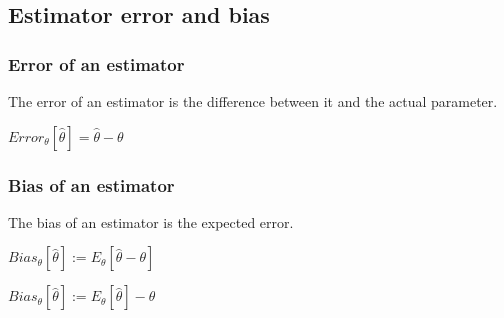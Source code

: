 
\subsection{Estimator error and bias}

\subsubsection{Error of an estimator}

The error of an estimator is the difference between it and the actual parameter.

\(Error_{\theta }[\hat \theta ]=\hat \theta - \theta \)

\subsubsection{Bias of an estimator}

The bias of an estimator is the expected error.

\(Bias_\theta [\hat \theta ]:=E_\theta [\hat \theta -\theta ]\)

\(Bias_\theta [\hat \theta ]:=E_\theta [\hat \theta] -\theta\)


